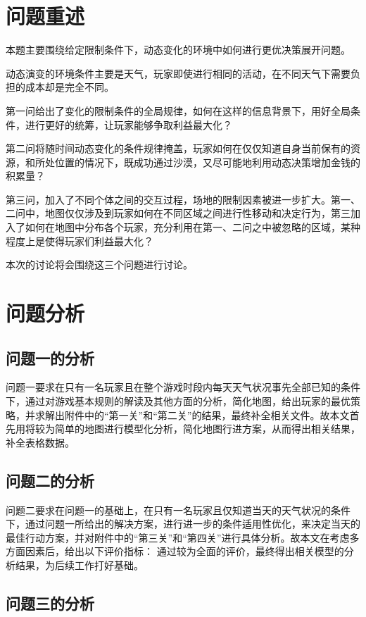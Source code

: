 \documentclass[a4paper]{ctexart}
\begin{document}
\section{问题重述}

本题主要围绕给定限制条件下，动态变化的环境中如何进行更优决策展开问题。

动态演变的环境条件主要是天气，玩家即使进行相同的活动，在不同天气下需要负担的成本却是完全不同。

第一问给出了变化的限制条件的全局规律，如何在这样的信息背景下，用好全局条件，进行更好的统筹，让玩家能够争取利益最大化？

第二问将随时间动态变化的条件规律掩盖，玩家如何在仅仅知道自身当前保有的资源，和所处位置的情况下，既成功通过沙漠，又尽可能地利用动态决策增加金钱的积累量？

第三问，加入了不同个体之间的交互过程，场地的限制因素被进一步扩大。第一、二问中，地图仅仅涉及到玩家如何在不同区域之间进行性移动和决定行为，第三加入了如何在地图中分布各个玩家，充分利用在第一、二问之中被忽略的区域，某种程度上是使得玩家们利益最大化？

本次的讨论将会围绕这三个问题进行讨论。

\section{问题分析}

\subsection{问题一的分析}

问题一要求在只有一名玩家且在整个游戏时段内每天天气状况事先全部已知的条件下，通过对游戏基本规则的解读及其他方面的分析，简化地图，给出玩家的最优策略，并求解出附件中的“第一关”和“第二关”的结果，最终补全相关文件。故本文首先用将较为简单的地图进行模型化分析，简化地图行进方案，从而得出相关结果，补全表格数据。

\subsection{问题二的分析}

问题二要求在问题一的基础上，在只有一名玩家且仅知道当天的天气状况的条件下，通过问题一所给出的解决方案，进行进一步的条件适用性优化，来决定当天的最佳行动方案，并对附件中的“第三关”和“第四关”进行具体分析。故本文在考虑多方面因素后，给出以下评价指标：  通过较为全面的评价，最终得出相关模型的分析结果，为后续工作打好基础。

\subsection{问题三的分析}
\end{document}
